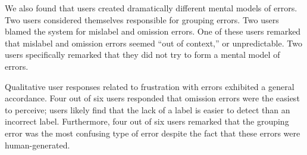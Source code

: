 \documentclass{elsart}
\begin{document}



We also found that users created dramatically different mental models
of errors.  Two users considered themselves responsible for grouping
errors.  Two users blamed the system for mislabel and omission errors.
One of these users remarked that mislabel and omission errors seemed
``out of context,'' or unpredictable.  Two users specifically remarked
that they did not try to form a mental model of errors.

Qualitative user responses related to frustration with errors
exhibited a general accordance.  Four out of six users responded that
omission errors were the easiest to perceive; users likely find that
the lack of a label is easier to detect than an incorrect label.
Furthermore, four out of six users remarked that the grouping error
was the most confusing type of error despite the fact that these
errors were human-generated.
\end{document}

